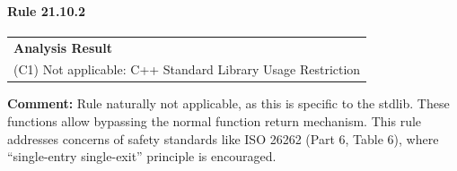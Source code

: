 \paragraph{Rule 21.10.2}
\begin{longtable}{p{13cm}}
\textbf{Analysis Result} \\
(C1) Not applicable: C++ Standard Library Usage Restriction \\
\end{longtable}
\textbf{Comment:} Rule naturally not applicable, as this is specific to the \Cpp stdlib. These functions allow bypassing the normal function return mechanism. This rule addresses concerns of safety standards like ISO 26262 (Part 6, Table 6), where ``single-entry single-exit'' principle is encouraged. \\
